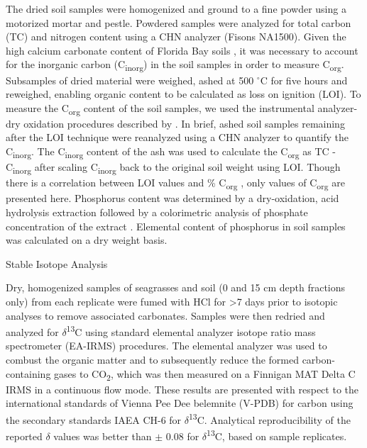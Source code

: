 The dried soil samples were homogenized and ground to a fine powder using a motorized mortar and pestle. Powdered samples were analyzed for total carbon (TC) and nitrogen content using a CHN analyzer (Fisons NA1500). Given the high calcium carbonate content of Florida Bay soils \citep{Bosence:1989wi}, it was necessary to account for the inorganic carbon (C\textsubscript{inorg}) in the soil samples in order to measure C\textsubscript{org}. Subsamples of dried material were weighed, ashed at 500 $^{\circ}$C for five hours and reweighed, enabling organic content to be calculated as loss on ignition (LOI). To measure the C\textsubscript{org} content of the soil samples, we used the instrumental analyzer-dry oxidation procedures described by \citet{Fourqurean:2012hu}. In brief, ashed soil samples remaining after the LOI technique were reanalyzed using a CHN analyzer to quantify the C\textsubscript{inorg}. The C\textsubscript{inorg} content of the ash was used to calculate the C\textsubscript{org} as TC - C\textsubscript{inorg} after scaling C\textsubscript{inorg} back to the original soil weight using LOI. Though there is a correlation between LOI values and \% C\textsubscript{org} \citep{Fourqurean:2012cv}, only values of C\textsubscript{org} are presented here. Phosphorus content was determined by a dry-oxidation, acid hydrolysis extraction followed by a colorimetric analysis of phosphate concentration of the extract \citep{Fourqurean:1992we}. Elemental content of phosphorus in soil samples was calculated on a dry weight basis.

\bigskip
\noindent Stable Isotope Analysis
\medskip


	Dry, homogenized samples of seagrasses and soil (0 and 15 cm depth fractions only) from each replicate were fumed with HCl for >7 days prior to isotopic analyses to remove associated carbonates. Samples were then redried and analyzed for $\delta$\textsuperscript{13}C using standard elemental analyzer isotope ratio mass spectrometer (EA-IRMS) procedures. The elemental analyzer was used to combust the organic matter and to subsequently reduce the formed carbon-containing gases to CO\textsubscript{2}, which was then measured on a Finnigan MAT Delta C IRMS in a continuous flow mode. These results are presented with respect to the international standards of Vienna Pee Dee belemnite (V-PDB) for carbon using the secondary standards IAEA CH-6 for $\delta$\textsuperscript{13}C. Analytical reproducibility of the reported $\delta$ values was better than $\pm$ 0.08 for $\delta$\textsuperscript{13}C, based on sample replicates.

